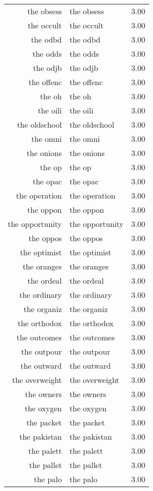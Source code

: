 \begin{table}[ht]
\begin{tabular}{rlr}
  the obsess & the obsess & 3.00 \\ 
  the occult & the occult & 3.00 \\ 
  the odbd & the odbd & 3.00 \\ 
  the odds & the odds & 3.00 \\ 
  the odjb & the odjb & 3.00 \\ 
  the offenc & the offenc & 3.00 \\ 
  the oh & the oh & 3.00 \\ 
  the oili & the oili & 3.00 \\ 
  the oldschool & the oldschool & 3.00 \\ 
  the omni & the omni & 3.00 \\ 
  the onions & the onions & 3.00 \\ 
  the op & the op & 3.00 \\ 
  the opac & the opac & 3.00 \\ 
  the operation & the operation & 3.00 \\ 
  the oppon & the oppon & 3.00 \\ 
  the opportunity & the opportunity & 3.00 \\ 
  the oppos & the oppos & 3.00 \\ 
  the optimist & the optimist & 3.00 \\ 
  the oranges & the oranges & 3.00 \\ 
  the ordeal & the ordeal & 3.00 \\ 
  the ordinary & the ordinary & 3.00 \\ 
  the organiz & the organiz & 3.00 \\ 
  the orthodox & the orthodox & 3.00 \\ 
  the outcomes & the outcomes & 3.00 \\ 
  the outpour & the outpour & 3.00 \\ 
  the outward & the outward & 3.00 \\ 
  the overweight & the overweight & 3.00 \\ 
  the owners & the owners & 3.00 \\ 
  the oxygen & the oxygen & 3.00 \\ 
  the packet & the packet & 3.00 \\ 
  the pakistan & the pakistan & 3.00 \\ 
  the palett & the palett & 3.00 \\ 
  the pallet & the pallet & 3.00 \\ 
  the palo & the palo & 3.00 \\ 

\end{tabular}
\end{table}

